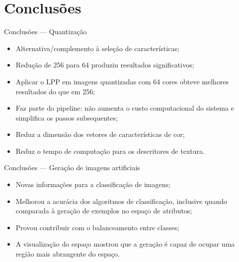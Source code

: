 \documentclass[10pt]{beamer}
\begin{document}
\section{Conclusões}
\begin{frame}{Conclusões --- Quantização}
  \setlength\leftmargini{1em}
  \begin{itemize}
    \item Alternativa/complemento à seleção de características;
    \item Redução de 256 para 64 produziu resultados significativos;
    \item Aplicar o LPP em imagens quantizadas com 64 cores obteve melhores resultados do que em 256;
    \item Faz parte do pipeline: não aumenta o custo computacional do sistema e simplifica os passos subsequentes;
    \item Reduz a dimensão dos vetores de características de cor;
    \item Reduz o tempo de computação para os descritores de textura.
  \end{itemize}
\end{frame}
\begin{frame}{Conclusões --- Geração de imagens artificiais}
  \setlength\leftmargini{1em}
  \begin{itemize}
    \item Novas informações para a classificação de imagens;
    \item Melhorou a acurácia dos algoritmos de classificação, inclusive quando comparada à geração de exemplos no espaço de atributos;
    \item Provou contribuir com o balanceamento entre classes;
    \item A visualização do espaço mostrou que a geração é capaz de ocupar uma região mais abrangente do espaço.
  \end{itemize}
\end{frame}
\end{document}
